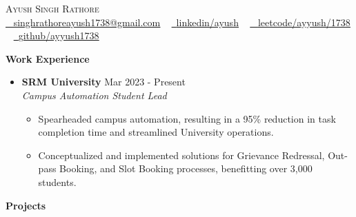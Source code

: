 \documentclass{article}
\newcommand{\resumesection}[1]{\vspace{0.2pt}\noindent\textbf{#1}}
\begin{document}
\begin{center}
    {\Huge \scshape Ayush Singh Rathore} \\  
    \vspace{1pt}
    \href{mailto:singhrathoreayush1738@gmail.com}{\raisebox{-0.2\height}{\faEnvelope}\ \textcolor{linkblue} {\underline{ singhrathoreayush1738@gmail.com}}} ~
    \href{https://www.linkedin.com/in/ayush-singh-rathore-17943b220/}{\raisebox{-0.2\height}{\faLinkedin}\ \textcolor{linkblue}{\underline{linkedin/ayush}}} ~ %
    \href{https://leetcode.com/ayush_1738/}{\raisebox{-0.2\height}{\faFileCode}\ {\faLeetCode} \textcolor{linkblue}{\underline{leetcode/ayyush/1738}}} ~ %
    \href{https://github.com/ayyush1738}{\raisebox{-0.2\height}{\faGithub}\ \textcolor{linkblue}{\underline{github/ayyush1738}}} %
\end{center}


\resumesection{Work Experience}

\noindent\makebox[\linewidth]{\rule{\textwidth}{0.4pt}}

\begin{itemize}[leftmargin=*]
    \item \textbf{SRM University} \hfill Mar 2023 - Present \\
    \textit{Campus Automation Student Lead}
    \begin{itemize}[leftmargin=*]
        \item Spearheaded campus automation, resulting in a 95\% reduction in task completion time and streamlined University operations.
        \item Conceptualized and implemented solutions for Grievance Redressal, Out-pass Booking, and Slot Booking processes, benefitting over 3,000 students.
    \end{itemize}
\end{itemize}

\resumesection{Projects}

\noindent\makebox[\linewidth]{\rule{\textwidth}{0.4pt}}
\end{document}
